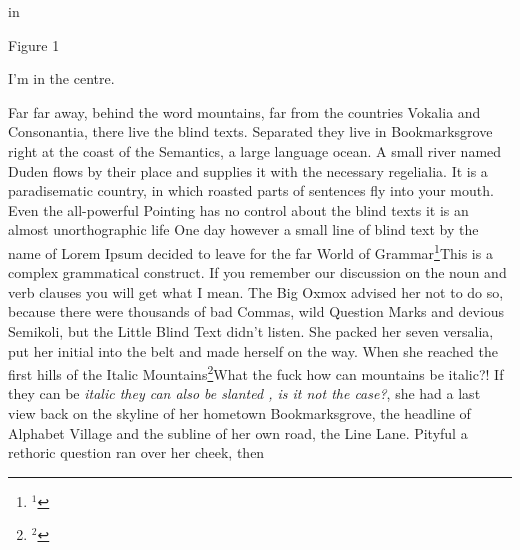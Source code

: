 \topinsert
{} in
\centerline{Figure 1}
\endinsert

\centerline{I’m in the centre.}



\eject
 Far far away, behind the word mountains, far from the countries Vokalia and Consonantia, 
there live the blind texts. Separated they live in Bookmarksgrove right at the coast of 
the Semantics, a large language ocean. A small river named Duden flows by their place and 
supplies it with the necessary regelialia. It is a paradisematic country, in which roasted 
parts of sentences fly into your mouth. Even the all-powerful Pointing has no control about 
the blind texts it is an almost unorthographic life One day however a small line of blind text 
by the name of Lorem Ipsum decided to leave for the far World of Grammar\footnote{${}^{1}$}{This is a complex grammatical construct. If you
remember our discussion on the noun and verb clauses you will get what I mean}. The Big Oxmox advised 
her not to do so, because there were thousands of bad Commas, wild Question Marks and devious Semikoli,
 but the Little Blind Text didn’t listen. She packed her seven versalia, put her initial into the belt 
 and made herself on the way. When she reached the first hills of the Italic Mountains\footnote{${}^{2}$}{What the fuck how 
 can mountains be italic?! If they can be \it italic \rm they can also be \sl slanted\/ \rm, is it not the case?}, she had a 
 last view back on the skyline of her hometown Bookmarksgrove, the headline of Alphabet Village and 
 the subline of her own road, the Line Lane. Pityful a rethoric question ran over her cheek, then 

\bye
